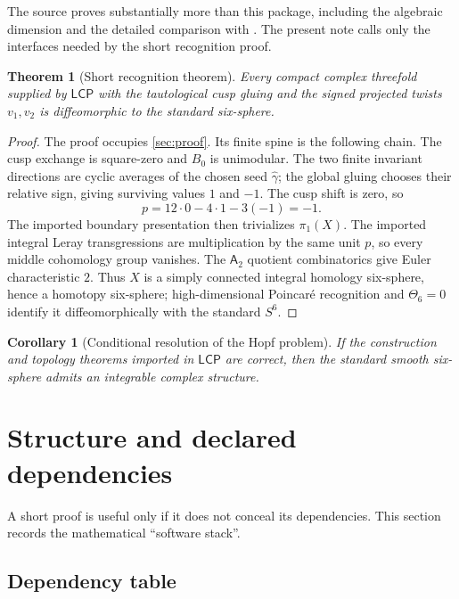 \documentclass[11pt,reqno]{amsart}
\numberwithin{equation}{section}
\newcommand{\wideg}{\widehat\gamma}
\newcommand{\LCP}{\mathsf{LCP}}
\newcommand{\Aroot}{\mathsf{A}_2}
\newtheorem{theorem}{Theorem}[section]
\newtheorem{corollary}[corollary]{Corollary}
\theoremstyle{definition}
\begin{document}
The source proves substantially more than this package, including the algebraic dimension and the detailed comparison with \cite{CDP20}. The present note calls only the interfaces needed by the short recognition proof.

\begin{theorem}[Short recognition theorem]\label{thm:main}
Every compact complex threefold supplied by $\LCP$ with the tautological cusp gluing and the signed projected twists $v_1,v_2$ is diffeomorphic to the standard six-sphere.
\end{theorem}

\begin{proof}
The proof occupies \cref{sec:proof}. Its finite spine is the following chain. The cusp exchange is square-zero and $B_0$ is unimodular. The two finite invariant directions are cyclic averages of the chosen seed $\wideg$; the global gluing chooses their relative sign, giving surviving values $1$ and $-1$. The cusp shift is zero, so
\[
 p=12\cdot0-4\cdot1-3(-1)=-1.
\]
The imported boundary presentation then trivializes $\pi_1(X)$. The imported integral Leray transgressions are multiplication by the same unit $p$, so every middle cohomology group vanishes. The $\Aroot$ quotient combinatorics give Euler characteristic $2$. Thus $X$ is a simply connected integral homology six-sphere, hence a homotopy six-sphere; high-dimensional Poincar\'e recognition and $\Theta_6=0$ identify it diffeomorphically with the standard $S^6$.
\end{proof}

\begin{corollary}[Conditional resolution of the Hopf problem]\label{cor:conditional}
If the construction and topology theorems imported in $\LCP$ are correct, then the standard smooth six-sphere admits an integrable complex structure.
\end{corollary}

\section{Structure and declared dependencies}\label{sec:dependencies}

A short proof is useful only if it does not conceal its dependencies. This section records the mathematical ``software stack''.

\subsection{Dependency table}
\end{document}
